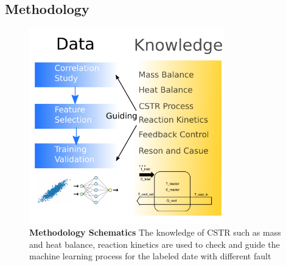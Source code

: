 \documentclass[fleqn,11pt]{wlscirep}
\begin{document}
\subsection*{Methodology}
\begin{figure}[h]
    \centering
    \includegraphics[width=8.5cm]{method.pdf}
    \caption{
    \textbf{Methodology Schematics } The knowledge of CSTR such as mass and heat balance, reaction kinetics are used to check and guide the machine learning process for the labeled date with different fault}
    \label{fig:1}
\end{figure}
\end{document}

